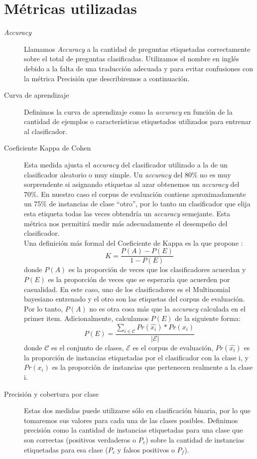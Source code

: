 \section{Métricas utilizadas}
\begin{description}
    \item[\textit{Accuracy}] Llamamos \textit{Accuracy} a la cantidad de preguntas etiquetadas correctamente sobre el total de preguntas clasificadas. Utilizamos el nombre en inglés debido a la falta de una traducción adecuada y para evitar confusiones con la métrica Precisión que describiremos a continuación.
    \item[Curva de aprendizaje] Definimos la curva de aprendizaje como la \textit{accuracy} en función de la cantidad de ejemplos o características etiquetados utilizados para entrenar al clasificador.
    \item [Coeficiente Kappa de Cohen] Esta medida ajusta el \textit{accuracy} del clasificador utilizado a la de un clasificador aleatorio o muy simple. Un \textit{accuracy} del 80\% no es muy sorprendente si asignando etiquetas al azar obtenemos un \textit{accuracy} del 70\%. En nuestro caso el corpus de evaluación contiene aproximadamente un 75\% de instancias de clase ``otro'', por lo tanto un clasificador que elija esta etiqueta todas las veces obtendría un \textit{accuracy} semejante. Esta métrica nos permitirá medir más adecuadamente el desempeño del clasificador.\\
    Una definición más formal del Coeficiente de Kappa es la que propone \citet{KappaCarletta}:
    $$K = \frac{P(A)-P(E)}{1-P(E)}$$
    donde $P(A)$ es la proporción de veces que los clasificadores acuerdan y $P(E)$ es la proporción de veces que se esperaría que acuerden por casualidad. En este caso, uno de los clasificadores es el Multinomial bayesiano entrenado y el otro son las etiquetas del corpus de evaluación. Por lo tanto, $P(A)$ no es otra cosa más que la \textit{accuracy} calculada en el primer item. Adicionalmente, calculamos $P(E)$ de la siguiente forma:
    $$P(E) = \frac{\sum_{i\in\mathcal{C}}Pr(\hat{x_i})*Pr(x_i)}{|\mathcal{E}|}$$
    donde $\mathcal{C}$ es el conjunto de clases, $\mathcal{E}$ es el corpus de evaluación, $Pr(\hat{x_i})$ es la proporción de instancias etiquetadas por el clasificador con la clase i, y $Pr(x_i)$ es la proporción de instancias que pertenecen realmente a la clase i.
    \item [Precisión y cobertura por clase] Estas dos medidas puede utilizarse sólo en clasificación binaria, por lo que tomaremos sus valores para cada una de las clases posibles. Definimos precisión como la cantidad de instancias etiquetadas para una clase que son correctas (positivos verdaderos o $P_v$) sobre la cantidad de instancias etiquetadas para esa clase ($P_v$ y falsos positivos o $P_f$).

\end{description}
